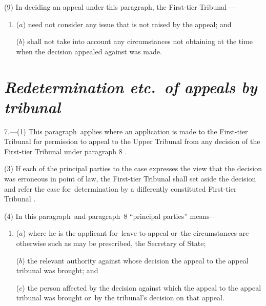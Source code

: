\documentclass[12pt,a4paper]{article}
\begin{document}
(9) In deciding an appeal under this paragraph, 
the First-tier Tribunal%
—
\begin{enumerate}\item[]
($a$) need not consider any issue that is not raised by the appeal; and

($b$) shall not take into account any circumstances not obtaining at the time when the decision appealed against was made.
\end{enumerate}


\section*{\itshape Redetermination etc.\ of appeals by tribunal}

7.---(1) This paragraph~applies where an application is made 
to the First-tier Tribunal for permission to appeal to the Upper Tribunal from any decision of the First-tier Tribunal under paragraph 8%
.


(3) If each of the principal parties to the case expresses the view that the decision was erroneous in point of law, 
the First-tier Tribunal  %
shall set aside the decision and refer the case for~determination by a differently constituted 
First-tier Tribunal%
.

(4) In this paragraph~and paragraph~8 “principal parties” means—
\begin{enumerate}\item[]
($a$) where he is the applicant for~leave to appeal or~the circumstances are otherwise such as may be prescribed, the Secretary of State;

($b$) the relevant authority against whose decision the appeal to the appeal tribunal was brought; and

($c$) the person affected by the decision against which the appeal to the appeal tribunal was brought or~by the tribunal’s decision on that appeal.
\end{enumerate}
\end{document}
